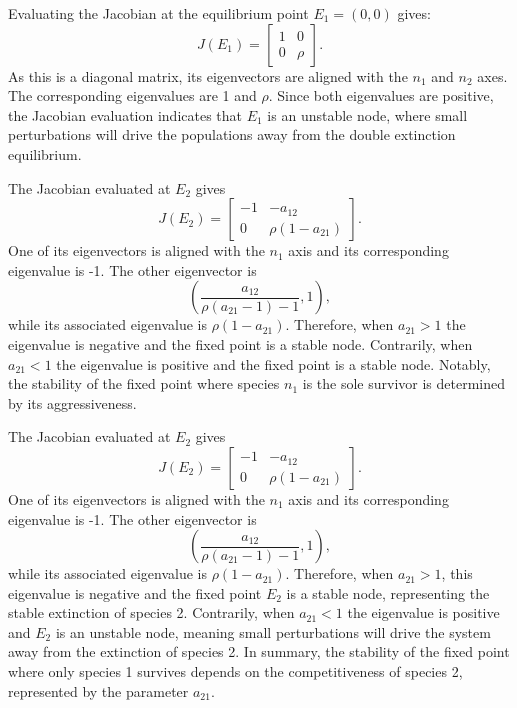 Evaluating the Jacobian at the equilibrium point $E_1=(0,0)$ gives:
\begin{equation*}
J(E_1) =
\begin{bmatrix}
1 & 0\\
0 & \rho
\end{bmatrix}.
\end{equation*}
As this is a diagonal matrix, its eigenvectors are aligned with the $n_1$ and $n_2$ axes. The corresponding eigenvalues are 1 and $\rho$. Since both eigenvalues are positive, the Jacobian evaluation indicates that $E_1$ is an unstable node, where small perturbations will drive the populations away from the double extinction equilibrium.

The Jacobian evaluated at $E_2$ gives
\begin{equation*}
J(E_2) =
\begin{bmatrix}
-1 & -a_{12}\\
0 & \rho(1-a_{21})
\end{bmatrix}.
\end{equation*}
One of its eigenvectors is aligned with the $n_1$ axis and its corresponding eigenvalue is -1. The other eigenvector is 
\begin{equation*}
    \left(\frac{a_{12}}{\rho(a_{21}-1)-1}, 1\right),
\end{equation*}
while its associated eigenvalue is $\rho(1-a_{21})$. Therefore, when $a_{21}>1$ the eigenvalue is negative and the fixed point is a stable node. Contrarily, when $a_{21}<1$ the eigenvalue is positive and the fixed point is a stable node. Notably, the stability of the fixed point where species $n_1$ is the sole survivor is determined by its aggressiveness.

The Jacobian evaluated at $E_2$ gives
\begin{equation*}
J(E_2) =
\begin{bmatrix}
-1 & -a_{12}\\
0 & \rho(1-a_{21})
\end{bmatrix}.
\end{equation*}
One of its eigenvectors is aligned with the $n_1$ axis and its corresponding eigenvalue is -1. The other eigenvector is
\begin{equation*}
\left(\frac{a_{12}}{\rho(a_{21}-1)-1}, 1\right),
\end{equation*}
while its associated eigenvalue is $\rho(1-a_{21})$. Therefore, when $a_{21}>1$, this eigenvalue is negative and the fixed point $E_2$ is a stable node, representing the stable extinction of species 2. Contrarily, when $a_{21}<1$ the eigenvalue is positive and $E_2$ is an unstable node, meaning small perturbations will drive the system away from the extinction of species 2. In summary, the stability of the fixed point where only species 1 survives depends on the competitiveness of species 2, represented by the parameter $a_{21}$.

